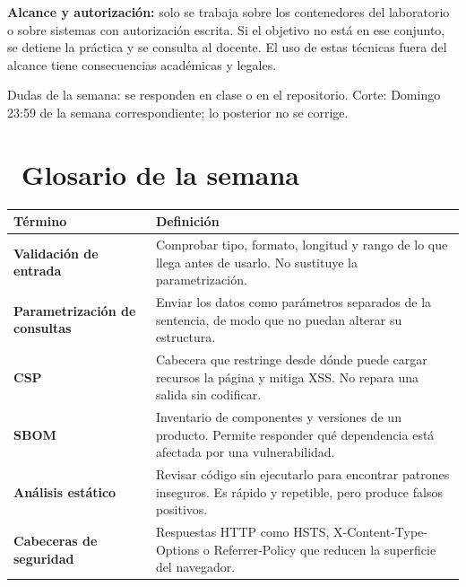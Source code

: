 \documentclass[11pt,a4paper]{article}
\newcommand{\iconotexto}[2]{\textcolor{cyanNeon}{\faIcon{#1}}~#2}
\begin{document}
\begin{tcolorbox}[cajaMejora]\textbf{Alcance y autorización:} solo se trabaja sobre los contenedores del laboratorio o sobre sistemas con autorización escrita. Si el objetivo no está en ese conjunto, se detiene la práctica y se consulta al docente. El uso de estas técnicas fuera del alcance tiene consecuencias académicas y legales.
\end{tcolorbox}

\begin{cajaRecuerda}Dudas de la semana: se responden en clase o en el repositorio. Corte: Domingo 23:59 de la semana correspondiente; lo posterior no se corrige.
\end{cajaRecuerda}

\clearpage

\section{\iconotexto{book}{Glosario de la semana}}

\small
\begin{longtable}{@{}>{\raggedright\arraybackslash}p{4.2cm}>{\raggedright\arraybackslash}p{\dimexpr\linewidth-4.2cm-12pt\relax}@{}}
\toprule
\textbf{Término} & \textbf{Definición}\\
\midrule
\endhead
\bottomrule
\endlastfoot
\textbf{Validación de entrada} & Comprobar tipo, formato, longitud y rango de lo que llega antes de usarlo. No sustituye la parametrización.\\
\textbf{Parametrización de consultas} & Enviar los datos como parámetros separados de la sentencia, de modo que no puedan alterar su estructura.\\
\textbf{CSP} & Cabecera que restringe desde dónde puede cargar recursos la página y mitiga XSS. No repara una salida sin codificar.\\
\textbf{SBOM} & Inventario de componentes y versiones de un producto. Permite responder qué dependencia está afectada por una vulnerabilidad.\\
\textbf{Análisis estático} & Revisar código sin ejecutarlo para encontrar patrones inseguros. Es rápido y repetible, pero produce falsos positivos.\\
\textbf{Cabeceras de seguridad} & Respuestas HTTP como HSTS, X-Content-Type-Options o Referrer-Policy que reducen la superficie del navegador.\\
\end{longtable}
\end{document}

